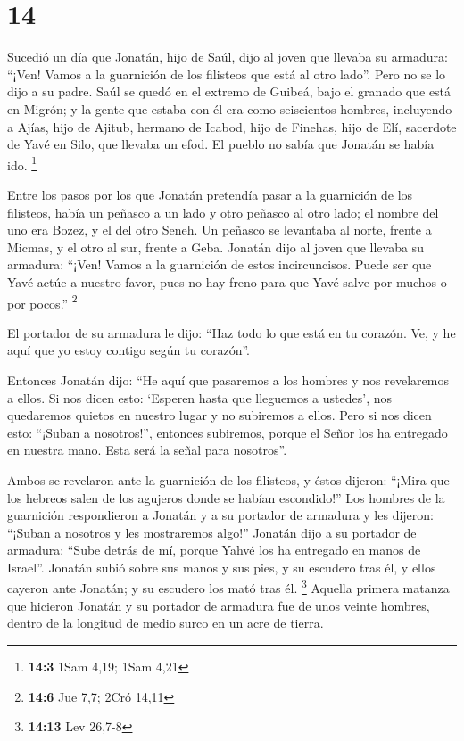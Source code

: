 \hypertarget{section-13}{%
\section{14}\label{section-13}}

 Sucedió un día que Jonatán, hijo de Saúl, dijo al joven
que llevaba su armadura: ``¡Ven! Vamos a la guarnición de los filisteos
que está al otro lado''. Pero no se lo dijo a su padre. 
Saúl se quedó en el extremo de Guibeá, bajo el granado que está en
Migrón; y la gente que estaba con él era como seiscientos hombres,
 incluyendo a Ajías, hijo de Ajitub, hermano de Icabod,
hijo de Finehas, hijo de Elí, sacerdote de Yavé en Silo, que llevaba un
efod. El pueblo no sabía que Jonatán se había ido. \footnote{\textbf{14:3}
  1Sam 4,19; 1Sam 4,21}

 Entre los pasos por los que Jonatán pretendía pasar a la
guarnición de los filisteos, había un peñasco a un lado y otro peñasco
al otro lado; el nombre del uno era Bozez, y el del otro Seneh.
 Un peñasco se levantaba al norte, frente a Micmas, y el
otro al sur, frente a Geba.  Jonatán dijo al joven que
llevaba su armadura: ``¡Ven! Vamos a la guarnición de estos
incircuncisos. Puede ser que Yavé actúe a nuestro favor, pues no hay
freno para que Yavé salve por muchos o por pocos.'' \footnote{\textbf{14:6}
  Jue 7,7; 2Cró 14,11}

 El portador de su armadura le dijo: ``Haz todo lo que
está en tu corazón. Ve, y he aquí que yo estoy contigo según tu
corazón''.

 Entonces Jonatán dijo: ``He aquí que pasaremos a los
hombres y nos revelaremos a ellos.  Si nos dicen esto:
`Esperen hasta que lleguemos a ustedes', nos quedaremos quietos en
nuestro lugar y no subiremos a ellos.  Pero si nos dicen
esto: ``¡Suban a nosotros!'', entonces subiremos, porque el Señor los ha
entregado en nuestra mano. Esta será la señal para nosotros''.

 Ambos se revelaron ante la guarnición de los filisteos,
y éstos dijeron: ``¡Mira que los hebreos salen de los agujeros donde se
habían escondido!''  Los hombres de la guarnición
respondieron a Jonatán y a su portador de armadura y les dijeron:
``¡Suban a nosotros y les mostraremos algo!'' Jonatán dijo a su portador
de armadura: ``Sube detrás de mí, porque Yahvé los ha entregado en manos
de Israel''.  Jonatán subió sobre sus manos y sus pies, y
su escudero tras él, y ellos cayeron ante Jonatán; y su escudero los
mató tras él. \footnote{\textbf{14:13} Lev 26,7-8} 
Aquella primera matanza que hicieron Jonatán y su portador de armadura
fue de unos veinte hombres, dentro de la longitud de medio surco en un
acre de tierra.

